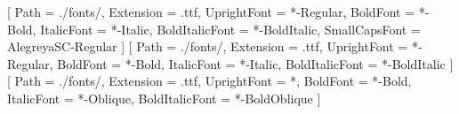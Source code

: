 
\usepackage{indentfirst}
\usepackage{polyglossia}
\setmainlanguage{portuges}
\usepackage{csquotes}

\usepackage{amsmath}
\usepackage{amssymb}
\usepackage{mathtools}
\usepackage{fontawesome5}

\setcounter{MaxMatrixCols}{20}

\usepackage{fontspec}
\setmainfont{CrimsonPro}[
  Path           = ./fonts/,
  Extension      = .ttf,
  UprightFont    = *-Regular,
  BoldFont       = *-Bold,
  ItalicFont     = *-Italic,
  BoldItalicFont = *-BoldItalic,
  SmallCapsFont  = AlegreyaSC-Regular
]
\setsansfont{NotoSans}[
  Path           = ./fonts/,
  Extension      = .ttf,
  UprightFont    = *-Regular,
  BoldFont       = *-Bold,
  ItalicFont     = *-Italic,
  BoldItalicFont = *-BoldItalic
]
\setmonofont[Scale=0.75]{DejaVuSansMono}[
  Path           = ./fonts/,
  Extension      = .ttf,
  UprightFont    = *,
  BoldFont       = *-Bold,
  ItalicFont     = *-Oblique,
  BoldItalicFont = *-BoldOblique
]

\usepackage[euler-hat-accent,small]{eulervm}

\usepackage{graphicx}         %
\usepackage{color}            %
\usepackage{multicol}         %
\usepackage{booktabs}         %
\usepackage[final,nopatch=toc]{microtype} %
\usepackage{siunitx}          %
\usepackage{placeins}
\usepackage[xindy,abbreviations]{glossaries-extra}
\makeglossaries
\usepackage{blochsphere}
\usepackage{braket}
\usepackage{makecell}
\usepackage{enumitem}
\usepackage{multirow}
\usepackage{xcolor}
\usepackage{tikz}
\usetikzlibrary{angles,matrix,arrows.meta,calc,positioning,intersections,shadows,plotmarks,3d,quotes,quantikz}

